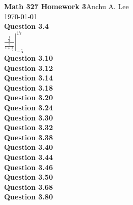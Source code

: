 \documentclass{article}
\begin{document}
    \noindent\textbf{Math 327 Homework 3}\hfill Anchu A. Lee\\
    \noindent\today\\
    
    \noindent\textbf{Question 3.4}\\
    $  \left.\frac{\frac{1}{x}}{\frac{5}{1+\frac{x}{7}}}\right\vert_{-5}^{17}$\\
    
    \textbf{Question 3.10}\\
    \textbf{Question 3.12}\\
    \textbf{Question 3.14}\\
    \textbf{Question 3.18}\\
    \textbf{Question 3.20}\\
    \textbf{Question 3.24}\\
    \textbf{Question 3.30}\\
    \textbf{Question 3.32}\\
    \textbf{Question 3.38}\\
    \textbf{Question 3.40}\\
    \textbf{Question 3.44}\\
    \textbf{Question 3.46}\\
    \textbf{Question 3.50}\\
    \textbf{Question 3.68}\\
    \textbf{Question 3.80}\\
\end{document}
